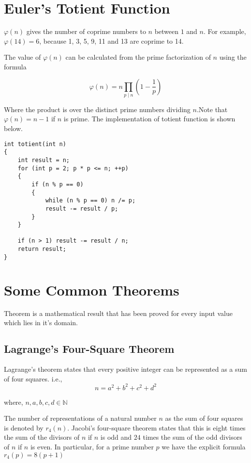 \documentclass[twoside,12pt,a4paper,english]{book}
\theoremstyle{definition}
\theoremstyle{problemstyle}
\theoremstyle{problemstyle}
\theoremstyle{problemstyle}
\begin{document}
\section{Euler's Totient Function}


 $\varphi(n)$
gives the number of coprime numbers to $n$
between $1$ and $n$.
For example, $\varphi(14)=6$,
because 1, 3, 5, 9, 11 and 13
are coprime to 14.

The value of $\varphi(n)$ can be calculated
from the prime factorization of $n$
using the formula

$$\varphi (n)=n\prod _{p\mid n}\left(1-{\frac {1}{p}}\right)$$

Where the product is over the distinct prime numbers dividing $n$.Note that $\varphi(n)=n-1$ if $n$ is prime. The implementation of totient function is shown below.
\begin{lstlisting}
int totient(int n)
{
    int result = n;
    for (int p = 2; p * p <= n; ++p)
    {
        if (n % p == 0)
        {
            while (n % p == 0) n /= p;
            result -= result / p;
        }
    }
    
    if (n > 1) result -= result / n;
    return result;
}
\end{lstlisting}

\section{Some Common Theorems}
Theorem is a mathematical result that has been proved for every input value which lies in it's domain.

\subsection{Lagrange's Four-Square Theorem}
Lagrange’s theorem states that every positive integer can be represented as a
sum of four squares. i.e.,
$$n = a^2 + b^2 + c^2 + d^2$$

where, $n,a,b,c,d \in \mathbb{N}$

\vspace{5mm}

The number of representations of a natural number $n$ as the sum of four squares is denoted by $r_4(n)$. Jacobi's four-square theorem states that this is eight times the sum of the divisors of $n$ if $n$ is odd and $24$ times the sum of the odd divisors of $n$ if $n$ is even. In particular, for a prime number $p$ we have the explicit formula $r_4(p) = 8(p + 1)$
\end{document}
